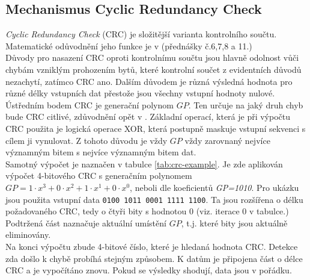 \subsection{Mechanismus Cyclic Redundancy Check}
\label{subsec:crc}
\textit{Cyclic Redundancy Check} (CRC) je složitější varianta kontrolního součtu. Matematické odůvodnění jeho funkce je v \cite{crc-prednasky} (přednášky č.6,7,8 a 11.)\\
Důvody pro nasazení CRC oproti kontrolnímu součtu jsou hlavně odolnost vůči chybám vzniklým prohozením bytů, které kontrolní součet z evidentních důvodů nezachytí, zatímco CRC ano. Dalším důvodem je různá výsledná hodnota pro různé délky vstupních dat přestože jsou všechny vstupní hodnoty nulové.\\
Ústředním bodem CRC je generační polynom $GP$. Ten určuje na jaký druh chyb bude CRC citlivé, zdůvodnění opět v \cite{crc-prednasky}. Základní operací, která je při výpočtu CRC použita je logická operace XOR, která postupně maskuje vstupní sekvenci s cílem ji vynulovat. Z tohoto důvodu je vždy $GP$ vždy zarovnaný nejvíce významným bitem s nejvíce významným bitem dat.\\
Samotný výpočet je naznačen v tabulce \ref{tab:crc-example}. Je zde aplikován výpočet 4-bitového CRC s generačním polynomem $GP=1 \cdot x^3 + 0 \cdot x^2 + 1 \cdot x^1 + 0 \cdot x^0$, neboli dle koeficientů \textit{GP=1010}. Pro ukázku jsou použita vstupní data \texttt{0100 1011 0001 1111 1100}. Ta jsou rozšířena o délku požadovaného CRC, tedy o čtyři bity s hodnotou 0 (viz. iterace 0 v tabulce.) Podtržená část naznačuje aktuální umístění $GP$, t.j. které bity jsou aktuálně eliminovány.\\
Na konci výpočtu zbude 4-bitové číslo, které je hledaná hodnota CRC. Detekce zda došlo k chybě probíhá stejným způsobem. K datům je připojena část o délce CRC a je vypočítáno znovu. Pokud se výsledky shodují, data jsou v pořádku.\\
